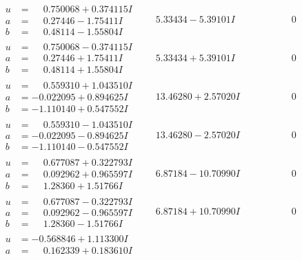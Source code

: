 \documentclass[1p]{elsarticle_modified}
\theoremstyle{definition}
\begin{document}
$$\begin{array}{c|c|c}
\begin{aligned}
u &= \phantom{-}0.750068 + 0.374115 I \\
a &= \phantom{-}0.27446 - 1.75411 I \\
b &= \phantom{-}0.48114 - 1.55804 I\end{aligned}
 & \phantom{-}5.33434 - 5.39101 I & \phantom{-0.000000 } 0 \\ \hline\begin{aligned}
u &= \phantom{-}0.750068 - 0.374115 I \\
a &= \phantom{-}0.27446 + 1.75411 I \\
b &= \phantom{-}0.48114 + 1.55804 I\end{aligned}
 & \phantom{-}5.33434 + 5.39101 I & \phantom{-0.000000 } 0 \\ \hline\begin{aligned}
u &= \phantom{-}0.559310 + 1.043510 I \\
a &= -0.022095 + 0.894625 I \\
b &= -1.110140 + 0.547552 I\end{aligned}
 & \phantom{-}13.46280 + 2.57020 I & \phantom{-0.000000 } 0 \\ \hline\begin{aligned}
u &= \phantom{-}0.559310 - 1.043510 I \\
a &= -0.022095 - 0.894625 I \\
b &= -1.110140 - 0.547552 I\end{aligned}
 & \phantom{-}13.46280 - 2.57020 I & \phantom{-0.000000 } 0 \\ \hline\begin{aligned}
u &= \phantom{-}0.677087 + 0.322793 I \\
a &= \phantom{-}0.092962 + 0.965597 I \\
b &= \phantom{-}1.28360 + 1.51766 I\end{aligned}
 & \phantom{-}6.87184 - 10.70990 I & \phantom{-0.000000 } 0 \\ \hline\begin{aligned}
u &= \phantom{-}0.677087 - 0.322793 I \\
a &= \phantom{-}0.092962 - 0.965597 I \\
b &= \phantom{-}1.28360 - 1.51766 I\end{aligned}
 & \phantom{-}6.87184 + 10.70990 I & \phantom{-0.000000 } 0 \\ \hline\begin{aligned}
u &= -0.568846 + 1.113300 I \\
a &= \phantom{-}0.162339 + 0.183610 I \\

\end{aligned}
\end{array}$$
\end{document}
